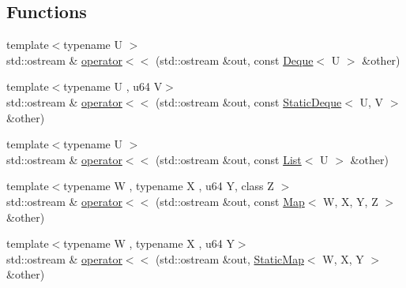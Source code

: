 \subsection*{Functions}
\begin{DoxyCompactItemize}
\item 
{\footnotesize template$<$typename U $>$ }\\std\-::ostream \& \hyperlink{namespacecrap_1_1container_abdc829dd4076de45cfe85819e835bf8b}{operator$<$$<$} (std\-::ostream \&out, const \hyperlink{classcrap_1_1container_1_1_deque}{Deque}$<$ U $>$ \&other)
\item 
{\footnotesize template$<$typename U , u64 V$>$ }\\std\-::ostream \& \hyperlink{namespacecrap_1_1container_a864141dcd961a9e71247559e0ff05661}{operator$<$$<$} (std\-::ostream \&out, const \hyperlink{classcrap_1_1container_1_1_static_deque}{Static\-Deque}$<$ U, V $>$ \&other)
\item 
{\footnotesize template$<$typename U $>$ }\\std\-::ostream \& \hyperlink{namespacecrap_1_1container_a78133a769407818cbe2ddb71fc00e5c4}{operator$<$$<$} (std\-::ostream \&out, const \hyperlink{classcrap_1_1container_1_1_list}{List}$<$ U $>$ \&other)
\item 
{\footnotesize template$<$typename W , typename X , u64 Y, class Z $>$ }\\std\-::ostream \& \hyperlink{namespacecrap_1_1container_aa17e0fbcf2fa0471ca3c244d63e9c7f7}{operator$<$$<$} (std\-::ostream \&out, const \hyperlink{classcrap_1_1container_1_1_map}{Map}$<$ W, X, Y, Z $>$ \&other)
\item 
{\footnotesize template$<$typename W , typename X , u64 Y$>$ }\\std\-::ostream \& \hyperlink{namespacecrap_1_1container_a472ce2927b25ecbc29dcb63e0ea15f7d}{operator$<$$<$} (std\-::ostream \&out, \hyperlink{classcrap_1_1container_1_1_static_map}{Static\-Map}$<$ W, X, Y $>$ \&other)
\end{DoxyCompactItemize}



